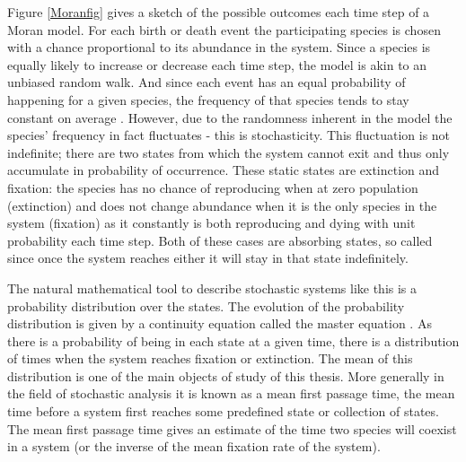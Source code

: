 Figure \ref{Moranfig} gives a sketch of the possible outcomes each time step of a Moran model. 
For each birth or death event the participating species is chosen with a chance proportional to its abundance in the system. 
Since a species is equally likely to increase or decrease each time step, the model is akin to an unbiased random walk. %
And since each event has an equal probability of happening for a given species, the frequency of that species tends to stay constant on average \cite{Kimura1955,Moran1962}. 
However, due to the randomness inherent in the model the species' frequency in fact fluctuates - this is stochasticity. 
This fluctuation is not indefinite; there are two states from which the system cannot exit and thus only accumulate in probability of occurrence. 
These static states are extinction and fixation: the species has no chance of reproducing when at zero population (extinction) and does not change abundance when it is the only species in the system (fixation) as it constantly is both reproducing and dying with unit probability each time step. 
Both of these cases are absorbing states, so called since once the system reaches either it will stay in that state indefinitely. 

The natural mathematical tool to describe stochastic systems like this is a probability distribution over the states. 
The evolution of the probability distribution is given by a continuity equation called the master equation \cite{Nisbet1982,Gardiner2004,Iyer-Biswas2015}. 
As there is a probability of being in each state at a given time, there is a distribution of times when the system reaches fixation or extinction. 
The mean of this distribution is one of the main objects of study of this thesis. 
More generally in the field of stochastic analysis it is known as a mean first passage time, the mean time before a system first reaches some predefined state or collection of states. 
The mean first passage time gives an estimate of the time two species will coexist in a system (or the inverse of the mean fixation rate of the system). 

